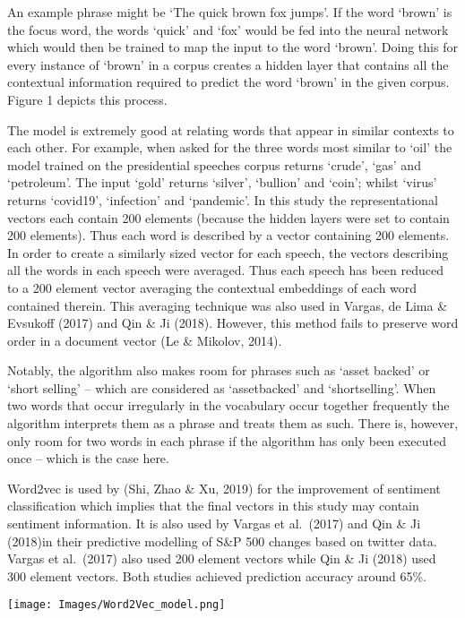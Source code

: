 \documentclass[11pt,preprint, authoryear]{elsarticle}
\let\origfigure\figure
\let\endorigfigure\endfigure
\renewenvironment{figure}[1][2] {
    \expandafter\origfigure\expandafter[H]
} {
    \endorigfigure
}
\numberwithin{equation}{section}
\numberwithin{figure}{section}
\numberwithin{table}{section}
\begin{document}
An example phrase might be `The quick brown fox jumps'. If the word
`brown' is the focus word, the words `quick' and `fox' would be fed into
the neural network which would then be trained to map the input to the
word `brown'. Doing this for every instance of `brown' in a corpus
creates a hidden layer that contains all the contextual information
required to predict the word `brown' in the given corpus. Figure 1
depicts this process.

The model is extremely good at relating words that appear in similar
contexts to each other. For example, when asked for the three words most
similar to `oil' the model trained on the presidential speeches corpus
returns `crude', `gas' and `petroleum'. The input `gold' returns
`silver', `bullion' and `coin'; whilst `virus' returns `covid19',
`infection' and `pandemic'. In this study the representational vectors
each contain 200 elements (because the hidden layers were set to contain
200 elements). Thus each word is described by a vector containing 200
elements. In order to create a similarly sized vector for each speech,
the vectors describing all the words in each speech were averaged. Thus
each speech has been reduced to a 200 element vector averaging the
contextual embeddings of each word contained therein. This averaging
technique was also used in Vargas, de Lima \& Evsukoff (2017) and Qin \&
Ji (2018). However, this method fails to preserve word order in a
document vector (Le \& Mikolov, 2014).

Notably, the algorithm also makes room for phrases such as `asset
backed' or `short selling' -- which are considered as `assetbacked' and
`shortselling'. When two words that occur irregularly in the vocabulary
occur together frequently the algorithm interprets them as a phrase and
treats them as such. There is, however, only room for two words in each
phrase if the algorithm has only been executed once -- which is the case
here.

Word2vec is used by (Shi, Zhao \& Xu, 2019) for the improvement of
sentiment classification which implies that the final vectors in this
study may contain sentiment information. It is also used by Vargas et
al.~(2017) and Qin \& Ji (2018)in their predictive modelling of S\&P 500
changes based on twitter data. Vargas et al.~(2017) also used 200
element vectors while Qin \& Ji (2018) used 300 element vectors. Both
studies achieved prediction accuracy around 65\%.

\begin{figure}
\centering
\texttt{[image: Images/Word2Vec\_model.png]}
\caption{Word2Vec model}
\end{figure}
\end{document}
